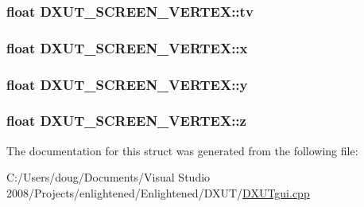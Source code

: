 \hypertarget{struct_d_x_u_t___s_c_r_e_e_n___v_e_r_t_e_x_adfeea1725a0f11599eab7544a2ee1649}{
\subsubsection[{tv}]{\setlength{\rightskip}{0pt plus 5cm}float {\bf DXUT\_\-SCREEN\_\-VERTEX::tv}}}
\label{struct_d_x_u_t___s_c_r_e_e_n___v_e_r_t_e_x_adfeea1725a0f11599eab7544a2ee1649}
\hypertarget{struct_d_x_u_t___s_c_r_e_e_n___v_e_r_t_e_x_a86437d26d068a9faeb2802b35b55940d}{
\subsubsection[{x}]{\setlength{\rightskip}{0pt plus 5cm}float {\bf DXUT\_\-SCREEN\_\-VERTEX::x}}}
\label{struct_d_x_u_t___s_c_r_e_e_n___v_e_r_t_e_x_a86437d26d068a9faeb2802b35b55940d}
\hypertarget{struct_d_x_u_t___s_c_r_e_e_n___v_e_r_t_e_x_a6a731737070bef7655f01dbed96fda89}{
\subsubsection[{y}]{\setlength{\rightskip}{0pt plus 5cm}float {\bf DXUT\_\-SCREEN\_\-VERTEX::y}}}
\label{struct_d_x_u_t___s_c_r_e_e_n___v_e_r_t_e_x_a6a731737070bef7655f01dbed96fda89}
\hypertarget{struct_d_x_u_t___s_c_r_e_e_n___v_e_r_t_e_x_ac036ee8f17d574b27aa47b2e9327ee00}{
\subsubsection[{z}]{\setlength{\rightskip}{0pt plus 5cm}float {\bf DXUT\_\-SCREEN\_\-VERTEX::z}}}
\label{struct_d_x_u_t___s_c_r_e_e_n___v_e_r_t_e_x_ac036ee8f17d574b27aa47b2e9327ee00}


The documentation for this struct was generated from the following file:\begin{DoxyCompactItemize}
\item 
C:/Users/doug/Documents/Visual Studio 2008/Projects/enlightened/Enlightened/DXUT/\hyperlink{_d_x_u_tgui_8cpp}{DXUTgui.cpp}\end{DoxyCompactItemize}
